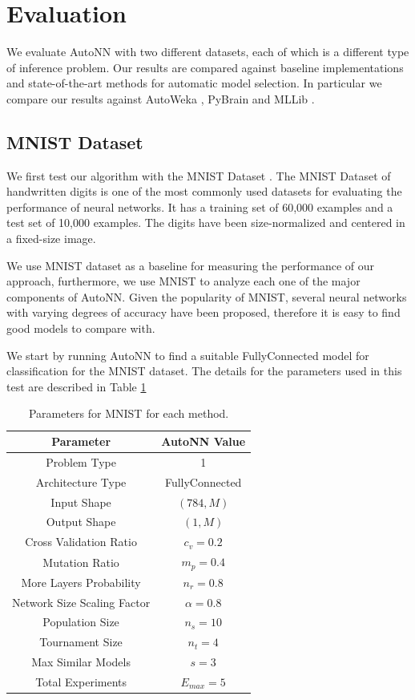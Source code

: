 \documentclass[journal]{IEEEtran}
\begin{document}
\section{Evaluation}
\label{sec:evaluation}

We evaluate AutoNN with two different datasets, each of which is a different type of inference problem. Our results are compared against baseline implementations and state-of-the-art methods for automatic model selection. In particular we compare our results against AutoWeka \cite{Thornton2016}, PyBrain \cite{Schaul2010} and MLLib \cite{mlib2017}.

\subsection{MNIST Dataset}

We first test our algorithm with the MNIST Dataset \cite{Lecun2010}. The MNIST Dataset of handwritten digits is one of the most commonly used datasets for evaluating the performance of neural networks. It has a training set of 60,000 examples and a test set of 10,000 examples. The digits have been size-normalized and centered in a fixed-size image.

We use MNIST dataset as a baseline for measuring the performance of our approach, furthermore, we use MNIST to analyze each one of the major components of AutoNN. Given the popularity of MNIST, several neural networks with varying degrees of accuracy have been proposed, therefore it is easy to find good models to compare with. 

We start by running AutoNN to find a suitable FullyConnected model for classification for the MNIST dataset. The details for the parameters used in this test are described in Table \ref{table:MNIST_params}

\begin{table}[!htb]
\begin{center}
\begin{tabular}{| c | c |}
\hline
Parameter & AutoNN Value \\
\hline
Problem Type & 1 \\
Architecture Type & FullyConnected \\
Input Shape & $(784, M)$  \\
Output Shape & $(1, M)$ \\
Cross Validation Ratio & $c_v = 0.2$ \\
Mutation Ratio & $m_p = 0.4$ \\
More Layers Probability & $n_r = 0.8$ \\
Network Size Scaling Factor & $\alpha = 0.8$ \\
Population Size & $n_s = 10$ \\
Tournament Size & $n_t = 4$ \\
Max Similar Models & $s = 3$ \\
Total Experiments & $E_{max} = 5$ \\
\hline
\end{tabular}
\end{center}
\caption{Parameters for MNIST for each method.}
\label{table:MNIST_params}
\end{table}
\end{document}
